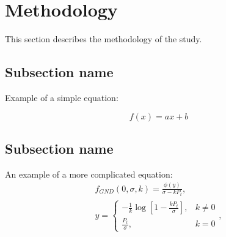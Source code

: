 \section{Methodology}
\label{sec:Method}

This section describes the methodology of the study.

\subsection{Subsection name}
\label{sec:}

Example of a simple equation:

\begin{equation}\label{eq:eq_descr_1}
f(x) = ax+b
\end{equation}

\subsection{Subsection name}
\label{sec:}

An example of a more complicated equation:
\begin{eqnarray}\label{eq:eq_descr_2}
f_{GND}(0, \sigma, k) = \frac{\phi(y)}{\sigma - k P_t},\\
y = \left\{
\begin{array}{ll}
 -\frac{1}{k} \log \left[  1 - \frac{k P_t}{\sigma} \right], & k \neq 0 \\
  \frac{P_t}{\sigma}, & k = 0
\end{array}
\right.\nonumber,
\end{eqnarray}